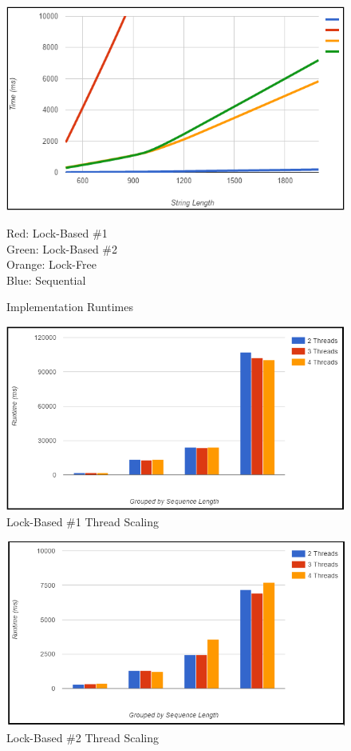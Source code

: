 \documentclass[letterpaper, 10 pt, conference]{IEEEconf}
\begin{document}
\begin{figure}
\centering
\includegraphics[scale=0.6]{sequential_vs_parallel}
\caption{Implementation Runtimes}
\medskip
\small
Red: Lock-Based \#1\\ Green: Lock-Based \#2\\ Orange: Lock-Free\\ Blue: Sequential    
\end{figure}

\begin{figure}
	\centering
	\includegraphics[scale=0.6]{parallel1}
	\caption{Lock-Based \#1 Thread Scaling} 
\end{figure}

\begin{figure}
	\centering
	\includegraphics[scale=0.6]{parallel2-lock}
	\caption{Lock-Based \#2 Thread Scaling} 
\end{figure}
\end{document}
